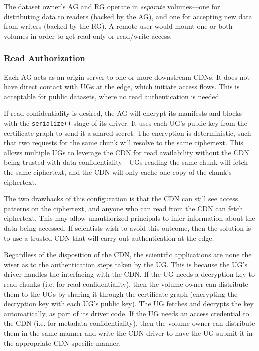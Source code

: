 The dataset owner's AG and RG operate in \emph{separate} volumes---one for
distributing data to readers (backed by the AG), and one for accepting new data
from writers (backed by the RG).  A remote user would mount one or both volumes
in order to get read-only or read/write access.

\subsubsection{Read Authorization}

Each AG acts as an origin server to one or more downstream CDNs.  It does not
have direct contact with UGs at the edge, which initiate access flows.  This is
acceptable for public datasets, where no read authentication is needed.

If read confidentiality is desired, the AG will encrypt its
manifests and blocks with the \texttt{serialize()} stage of its driver.  It uses each
UG's public key from the certificate graph to send it a shared secret.  The
encryption is deterministic, such that two requests for the same chunk will
resolve to the same ciphertext.  This allows multiple UGs to leverage the CDN
for read availability without the CDN being trusted with data
confidentiality---UGs reading the same chunk will fetch the same ciphertext, and
the CDN will only cache one copy of the chunk's ciphertext.

The two drawbacks of this configuration is that the CDN can still see access patterns
on the ciphertext, and anyone who can read from the CDN can fetch ciphertext.
This may allow unauthorized principals to infer information about the data being
accessed.  If scientists wish to avoid this outcome, then the solution is to use
a trusted CDN that will carry out authentication at the edge.

Regardless of the disposition of the CDN, the scientific applications are none
the wiser as to the authentication steps taken by the UG.  This is
because the UG's driver handles the interfacing with the CDN.  If the
UG needs a decryption key to read chunks (i.e. for read confidentiality), then
the volume owner can distribute them to the UGs by sharing it through the
certificate graph (encrypting the decryption key with each UG's public key).
The UG fetches and decrypts the key automatically, as part of its driver code.  If
the UG needs an access credential to the CDN (i.e. for metadata
confidentiality), then the volume owner can distribute them in the same manner
and write the CDN driver to have the UG submit it in the appropriate
CDN-specific manner.

